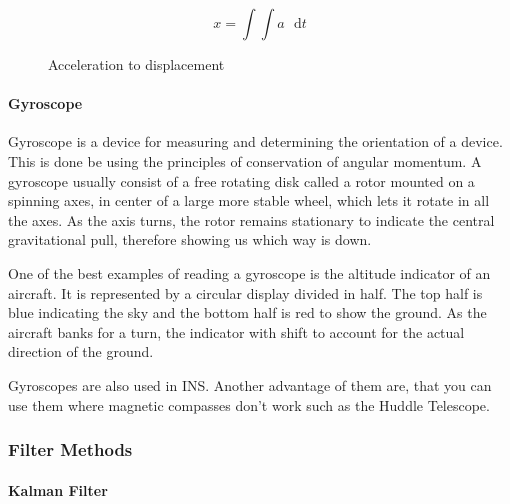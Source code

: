 \begin{figure}[H]
\[
x=\int\int a\mathrm{\text{ }d}t
\]
 

\protect\caption{Acceleration to displacement}


\end{figure}



\paragraph{Gyroscope}

Gyroscope is a device for measuring and determining the orientation
of a device. This is done be using the principles of conservation
of angular momentum. A gyroscope usually consist of a free rotating
disk called a rotor mounted on a spinning axes, in center of a large
more stable wheel, which lets it rotate in all the axes. As the axis
turns, the rotor remains stationary to indicate the central gravitational
pull, therefore showing us which way is down.

One of the best examples of reading a gyroscope is the altitude indicator
of an aircraft. It is represented by a circular display divided in
half. The top half is blue indicating the sky and the bottom half
is red to show the ground. As the aircraft banks for a turn, the indicator
with shift to account for the actual direction of the ground.

Gyroscopes are also used in INS. Another advantage of them are, that
you can use them where magnetic compasses don't work such as the Huddle
Telescope\cite{gyroscope-wiki}.

\subsubsection{Filter Methods}


\paragraph{Kalman Filter}

